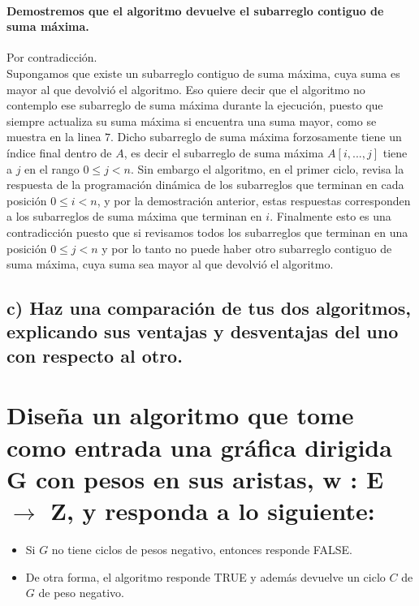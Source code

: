 \documentclass[12pt]{article}
\begin{document}
\paragraph{Demostremos que el algoritmo devuelve el subarreglo contiguo de suma máxima.}
Por contradicción.\\
Supongamos que existe un subarreglo contiguo de suma máxima, cuya suma es mayor al que devolvió el algoritmo. Eso quiere decir que el algoritmo no contemplo ese subarreglo de suma máxima durante la ejecución, puesto que siempre actualiza su suma máxima si encuentra una suma mayor, como se muestra en la linea $7$. Dicho subarreglo de suma máxima forzosamente tiene un índice final dentro de $A$, es decir el subarreglo de suma máxima $A[i,...,j]$ tiene a $j$ en el rango $0\leq j < n$. Sin embargo el algoritmo, en el primer ciclo, revisa la respuesta de la programación dinámica de los subarreglos que terminan en cada posición $0\leq i < n$, y por la demostración anterior, estas respuestas corresponden a los subarreglos de suma máxima que terminan en $i$. Finalmente esto es una contradicción puesto que si revisamos todos los subarreglos que terminan en una posición $0\leq j < n$ y por lo tanto no puede haber otro subarreglo contiguo de suma máxima, cuya suma sea mayor al que devolvió el algoritmo.\\
\subsection{c) Haz una comparación de tus dos algoritmos, explicando sus ventajas y desventajas del uno con respecto al otro.}
\section{Diseña un algoritmo que tome como entrada una gráfica dirigida G con pesos en sus aristas, w : E  $\rightarrow$ Z, y responda a lo siguiente:}
\begin{itemize}
	\item Si $G$ no tiene ciclos de pesos negativo, entonces responde FALSE.
	\item De otra forma, el algoritmo responde TRUE y además devuelve un ciclo $C$ de $G$ de peso negativo.
\end{itemize}
\end{document}
